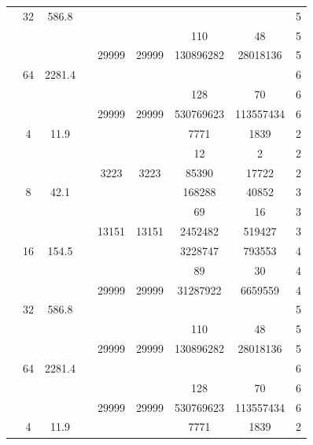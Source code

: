 \begin{table}[htbp]
\begin{tabular}{l S[table-format=3.0] S[table-format=4.1] l S[table-format=6.0] S[table-format=6.0] S[table-format=6.0] S[table-format=5.0] S[table-format=2.0]}
     & 32 & 586.8 &  & {\text{---}} & {\text{---}} & {\text{---}} & {\text{---}} & 5 \\
     &  &  &  & {\text{---}} & {\text{---}} & 110 & 48 & 5 \\
     &  &  &  & 29999 & 29999 & 130896282 & 28018136 & 5 \\
     & 64 & 2281.4 &  & {\text{---}} & {\text{---}} & {\text{---}} & {\text{---}} & 6 \\
     &  &  &  & {\text{---}} & {\text{---}} & 128 & 70 & 6 \\
     &  &  &  & 29999 & 29999 & 530769623 & 113557434 & 6 \\
    \midrule
     & 4 & 11.9 &  & {\text{---}} & {\text{---}} & 7771 & 1839 & 2 \\
     &  &  &  & {\text{---}} & {\text{---}} & 12 & 2 & 2 \\
     &  &  &  & 3223 & 3223 & 85390 & 17722 & 2 \\
     & 8 & 42.1 &  & {\text{---}} & {\text{---}} & 168288 & 40852 & 3 \\
     &  &  &  & {\text{---}} & {\text{---}} & 69 & 16 & 3 \\
     &  &  &  & 13151 & 13151 & 2452482 & 519427 & 3 \\
     & 16 & 154.5 &  & {\text{---}} & {\text{---}} & 3228747 & 793553 & 4 \\
     &  &  &  & {\text{---}} & {\text{---}} & 89 & 30 & 4 \\
     &  &  &  & 29999 & 29999 & 31287922 & 6659559 & 4 \\
     & 32 & 586.8 &  & {\text{---}} & {\text{---}} & {\text{---}} & {\text{---}} & 5 \\
     &  &  &  & {\text{---}} & {\text{---}} & 110 & 48 & 5 \\
     &  &  &  & 29999 & 29999 & 130896282 & 28018136 & 5 \\
     & 64 & 2281.4 &  & {\text{---}} & {\text{---}} & {\text{---}} & {\text{---}} & 6 \\
     &  &  &  & {\text{---}} & {\text{---}} & 128 & 70 & 6 \\
     &  &  &  & 29999 & 29999 & 530769623 & 113557434 & 6 \\
    \midrule
     & 4 & 11.9 &  & {\text{---}} & {\text{---}} & 7771 & 1839 & 2 \\

\end{tabular}
\end{table}
